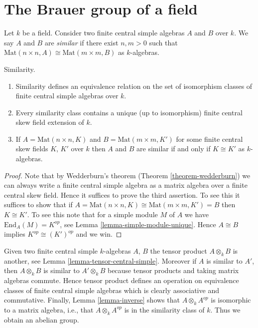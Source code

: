 \section{The Brauer group of a field}
\label{section-brauer}

\noindent
Let $k$ be a field. Consider two finite central simple algebras
$A$ and $B$ over $k$. We say $A$ and $B$ are {\it similar} if there
exist $n, m > 0$ such that
$\text{Mat}(n \times n, A) \cong \text{Mat}(m \times m, B)$
as $k$-algebras.

\begin{lemma}
\label{lemma-similar}
Similarity.
\begin{enumerate}
\item Similarity defines an equivalence relation on the set of isomorphism
classes of finite central simple algebras over $k$.
\item Every similarity class contains a unique (up to isomorphism)
finite central skew field extension of $k$.
\item If $A = \text{Mat}(n \times n, K)$ and $B = \text{Mat}(m \times m, K')$
for some finite central skew fields $K$, $K'$ over $k$
then $A$ and $B$ are similar if and only if $K \cong K'$ as $k$-algebras.
\end{enumerate}
\end{lemma}

\begin{proof}
Note that by Wedderburn's theorem (Theorem \ref{theorem-wedderburn})
we can always write a finite central simple algebra as a matrix
algebra over a finite central skew field. Hence it suffices to prove
the third assertion. To see this it suffices to show that if
$A = \text{Mat}(n \times n, K) \cong \text{Mat}(m \times m, K') = B$
then $K \cong K'$. To see this note that for a simple module $M$ of $A$
we have $\text{End}_A(M) = K^{op}$, see
Lemma \ref{lemma-simple-module-unique}.
Hence $A \cong B$ implies $K^{op} \cong (K')^{op}$ and we win.
\end{proof}

\noindent
Given two finite central simple $k$-algebras $A$, $B$ the tensor
product $A \otimes_k B$ is another, see
Lemma \ref{lemma-tensor-central-simple}.
Moreover if $A$ is similar to $A'$, then $A \otimes_k B$ is similar
to $A' \otimes_k B$ because tensor products and taking matrix
algebras commute. Hence tensor product defines an operation on
equivalence classes of finite central simple algebras which is clearly
associative and commutative. Finally,
Lemma \ref{lemma-inverse}
shows that $A \otimes_k A^{op}$ is isomorphic to a matrix algebra, i.e.,
that $A \otimes_k A^{op}$ is in the similarity class of $k$.
Thus we obtain an abelian group.

